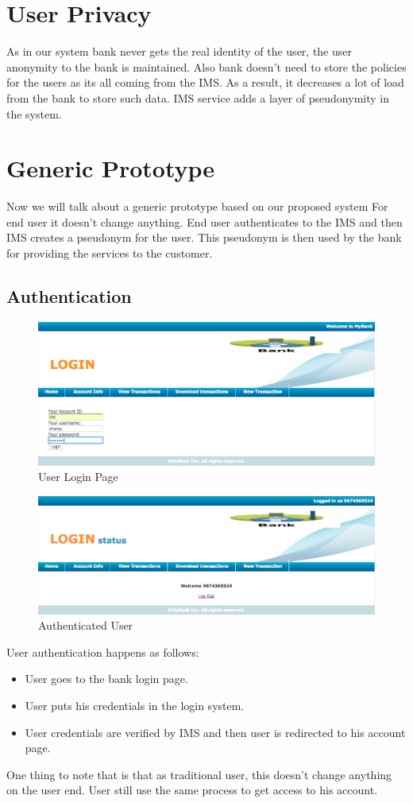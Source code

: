 \section{User Privacy}
As in our system bank never gets the real identity of the user, the user anonymity to the bank is maintained. Also bank doesn't need to store the policies for the users as its all coming from the IMS. As a result, it decreases a lot of load from the bank to store such data. IMS service adds a layer of pseudonymity in the system. 

\section{Generic Prototype}
Now we will talk about a generic prototype based on our proposed system 
For end user it doesn't change anything. End user authenticates to the IMS and then IMS creates a pseudonym for the user. This pseudonym is then used by the bank for providing the services to the customer.
\subsection{Authentication}
\begin{figure}[h]
	\centering
	\includegraphics[width=\textwidth]{figures/Login}
	\caption{User Login Page}
	\label{fig:Login}
\end{figure}
\begin{figure}[h]
	\centering
	\includegraphics[width=\textwidth]{figures/Logged}
	\caption{Authenticated User}
	\label{fig:Logged}
\end{figure}	
User authentication happens as follows:
\begin{itemize}
	\item User goes to the bank login page.
	\item User puts his credentials in the login system.
	\item User credentials are verified by IMS and then user is redirected to his account page.
\end{itemize}
One thing to note that is that as traditional user, this doesn't change anything on the user end. User still use the same process to get access to his account.

